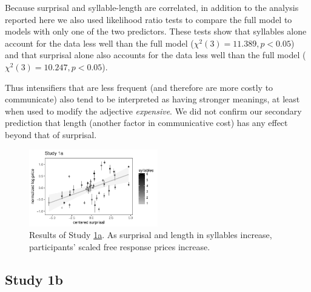 \documentclass[10pt,letterpaper]{article}
\begin{document}
Because surprisal and syllable-length are correlated, in addition to the analysis reported here we also used likelihood ratio tests to compare the full model to models with only one of the two predictors.
These tests show that syllables alone account for the data less well than the full model ($\chi^2(3)=11.389, p<0.05$) and that surprisal alone also accounts for the data less well than the full model ($\chi^2(3)=10.247, p<0.05$).

Thus intensifiers that are less frequent (and therefore are more costly to communicate) also tend to be interpreted as having stronger meanings, at least when used to modify the adjective \emph{expensive}.
We did not confirm our secondary prediction that length (another factor in communicative cost) has any effect beyond that of surprisal.

\begin{figure}[ht]
\begin{center}
\includegraphics[width=0.5\textwidth]{images/plot_study1a.pdf}
\end{center}
\caption{Results of Study \hyperref[sec:study1a]{1a}. As surprisal and length in syllables increase, participants' scaled free response prices increase.} 
\label{fig:plot_study1a}
\end{figure}

\subsection{Study 1b \label{sec:study1b}}
\end{document}
